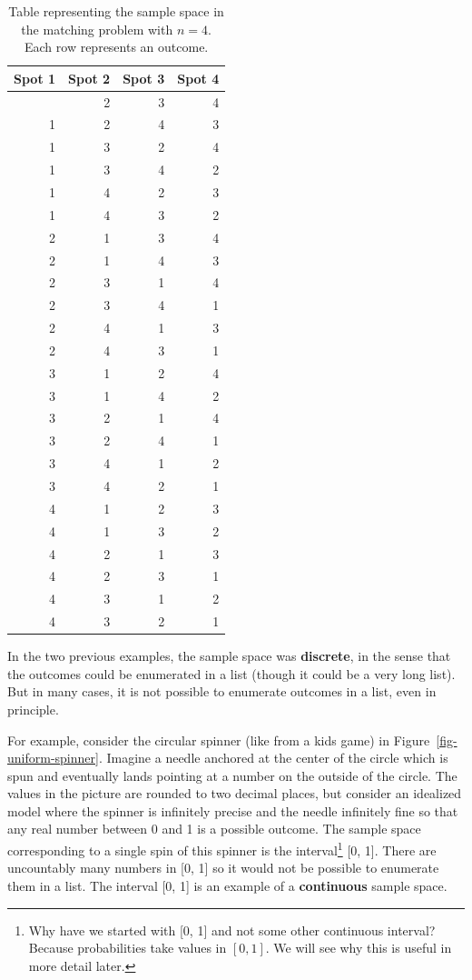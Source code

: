 \documentclass[
  letterpaper,
  DIV=11,
  numbers=noendperiod]{scrreprt}
\theoremstyle{plain}
\theoremstyle{definition}
\theoremstyle{definition}
\theoremstyle{definition}
\theoremstyle{remark}
\begin{document}
\begin{longtable}[]{@{}rrrr@{}}

\caption{\label{tbl-matching-outcome}Table representing the sample space
in the matching problem with \(n=4\). Each row represents an outcome.}

\tabularnewline

\toprule\noalign{}
Spot 1 & Spot 2 & Spot 3 & Spot 4 \\
\midrule\noalign{}
\endhead
\bottomrule\noalign{}
\endlastfoot
1 & 2 & 3 & 4 \\
1 & 2 & 4 & 3 \\
1 & 3 & 2 & 4 \\
1 & 3 & 4 & 2 \\
1 & 4 & 2 & 3 \\
1 & 4 & 3 & 2 \\
2 & 1 & 3 & 4 \\
2 & 1 & 4 & 3 \\
2 & 3 & 1 & 4 \\
2 & 3 & 4 & 1 \\
2 & 4 & 1 & 3 \\
2 & 4 & 3 & 1 \\
3 & 1 & 2 & 4 \\
3 & 1 & 4 & 2 \\
3 & 2 & 1 & 4 \\
3 & 2 & 4 & 1 \\
3 & 4 & 1 & 2 \\
3 & 4 & 2 & 1 \\
4 & 1 & 2 & 3 \\
4 & 1 & 3 & 2 \\
4 & 2 & 1 & 3 \\
4 & 2 & 3 & 1 \\
4 & 3 & 1 & 2 \\
4 & 3 & 2 & 1 \\

\end{longtable}

In the two previous examples, the sample space was \textbf{discrete}, in
the sense that the outcomes could be enumerated in a list (though it
could be a very long list). But in many cases, it is not possible to
enumerate outcomes in a list, even in principle.

For example, consider the circular spinner (like from a kids game) in
Figure~\ref{fig-uniform-spinner}. Imagine a needle anchored at the
center of the circle which is spun and eventually lands pointing at a
number on the outside of the circle. The values in the picture are
rounded to two decimal places, but consider an idealized model where the
spinner is infinitely precise and the needle infinitely fine so that any
real number between 0 and 1 is a possible outcome. The sample space
corresponding to a single spin of this spinner is the
interval\footnote{Why have we started with {[}0, 1{]} and not some other
  continuous interval? Because probabilities take values in \([0, 1]\).
  We will see why this is useful in more detail later.} {[}0, 1{]}.
There are uncountably many numbers in {[}0, 1{]} so it would not be
possible to enumerate them in a list. The interval {[}0, 1{]} is an
example of a \textbf{continuous} sample space.
\end{document}
